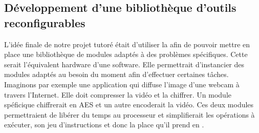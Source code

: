 \subsection{Développement d'une bibliothèque d'outils reconfigurables}

L'idée finale de notre projet tutoré était d'utiliser la  afin de pouvoir mettre en place une bibliothèque de modules adaptés à des problèmes spécifiques. Cette  serait l'équivalent hardware d'une  software. Elle permettrait d'instancier des modules adaptés au besoin du moment afin d'effectuer certaines tâches. Imaginons par exemple une application qui diffuse l'image d'une webcam à travers l'Internet. Elle doit compresser la vidéo et la chiffrer. Un module spéficique chiffrerait en AES et un autre encoderait la vidéo. Ces deux modules permettraient de libérer du temps au processeur et simplifierait les opérations à exécuter, son jeu d'instructions et donc la place qu'il prend en \fpga{}.